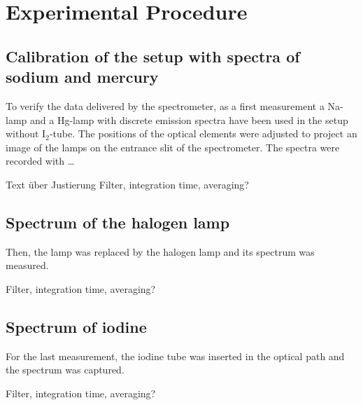 \section{Experimental Procedure}

\subsection{Calibration of the setup with spectra of sodium and mercury}
To verify the data delivered by the spectrometer, as a first measurement a Na-lamp and a Hg-lamp
with discrete emission spectra have been used in the setup without I$_2$-tube.
The positions of the optical elements were adjusted to project an image of the lamps on the entrance slit
of the spectrometer.
The spectra were recorded with \ldots

Text über Justierung
Filter, integration time, averaging?

\subsection{Spectrum of the halogen lamp}
Then, the lamp was replaced by the halogen lamp and its spectrum was measured.

Filter, integration time, averaging?

\subsection{Spectrum of iodine}
For the last measurement, the iodine tube was inserted in the optical path and the spectrum was captured.

Filter, integration time, averaging?
